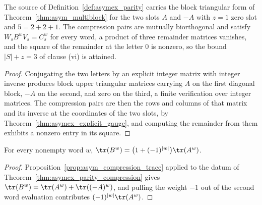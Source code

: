 \begin{theorem}
    \label{thm:asymex_parity_compression}
    \leanok
    The source of Definition~\ref{def:asymex_parity} carries the block
    triangular form of Theorem~\ref{thm:asym_multiblock} for the two slots
    $A$ and $-A$ with $z=1$ zero slot and $5=2+2+1$. The compression pairs
    are mutually biorthogonal and satisfy $W_sB^wV_s=C_s^w$ for every word,
    a product of three remainder matrices vanishes, and the square of the
    remainder at the letter $0$ is nonzero, so the bound $|S|+z=3$ of
    clause (vi) is attained.
\end{theorem}

\begin{proof}
    \leanok
    Conjugating the two letters by an explicit integer matrix with integer
    inverse produces block upper triangular matrices carrying $A$ on the
    first diagonal block, $-A$ on the second, and zero on the third, a
    finite verification over integer matrices. The compression pairs are
    then the rows and columns of that matrix and its inverse at the
    coordinates of the two slots, by
    Theorem~\ref{thm:asymex_explicit_gauge}, and computing the remainder
    from them exhibits a nonzero entry in its square.
\end{proof}

\begin{theorem}
    \label{thm:asymex_parity_trace}
    \leanok
    For every nonempty word $w$,
    $\tr(B^w)=\bigl(1+(-1)^{|w|}\bigr)\tr(A^w)$.
\end{theorem}

\begin{proof}
    \leanok
    Proposition~\ref{prop:asym_compression_trace} applied to the datum of
    Theorem~\ref{thm:asymex_parity_compression} gives
    $\tr(B^w)=\tr(A^w)+\tr((-A)^w)$, and pulling the weight $-1$ out of the
    second word evaluation contributes $(-1)^{|w|}\tr(A^w)$.
\end{proof}


